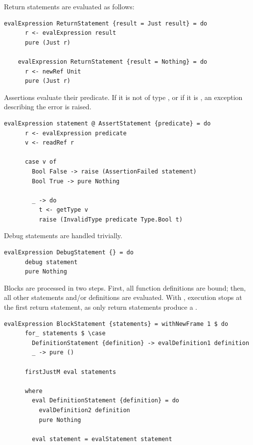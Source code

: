 \documentclass[UdineBachThesis,american,11pt]{PhdThesis}
\begin{document}
  \newpage

  Return statements are evaluated as follows:

  \begin{lstlisting}[gobble=4,basicstyle=\ttfamily\small]
    evalExpression ReturnStatement {result = Just result} = do
      r <- evalExpression result
      pure (Just r)

    evalExpression ReturnStatement {result = Nothing} = do
      r <- newRef Unit
      pure (Just r)
  \end{lstlisting}

  Assertions evaluate their predicate. If it is not of type \lstinline@Bool@,
  or if it is \lstinline@false@, an exception describing the error is raised.

  \begin{lstlisting}[gobble=4,basicstyle=\ttfamily\small]
    evalExpression statement @ AssertStatement {predicate} = do
      r <- evalExpression predicate
      v <- readRef r

      case v of
        Bool False -> raise (AssertionFailed statement)
        Bool True -> pure Nothing

        _ -> do
          t <- getType v
          raise (InvalidType predicate Type.Bool t)
  \end{lstlisting}

  Debug statements are handled trivially.

  \begin{lstlisting}[gobble=4,basicstyle=\ttfamily\small]
    evalExpression DebugStatement {} = do
      debug statement
      pure Nothing
  \end{lstlisting}

  Blocks are processed in two steps. First, all function definitions are bound;
  then, all other statements and/or definitions are evaluated. With
  \lstinline@firstJustM@, execution stops at the first return statement, as
  only return statements produce a \lstinline@Just@.

  \begin{lstlisting}[gobble=4,basicstyle=\ttfamily\small]
    evalExpression BlockStatement {statements} = withNewFrame 1 $ do
      for_ statements $ \case
        DefinitionStatement {definition} -> evalDefinition1 definition
        _ -> pure ()

      firstJustM eval statements

      where
        eval DefinitionStatement {definition} = do
          evalDefinition2 definition
          pure Nothing

        eval statement = evalStatement statement
  \end{lstlisting}
\end{document}
